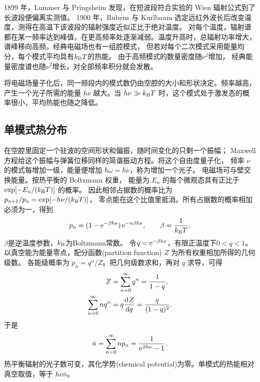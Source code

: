 1899 年，Lummer 与 Pringsheim 发现，在短波段符合实验的 Wien 辐射公式到了长波段便偏离实测值。
1900 年，Rubens 与 Kurlbaum 选定远红外波长后改变温度，测得在高温下该波段的辐射强度近似正比于绝对温度\cite{history}。
对每个温度，辐射谱都在某一频率达到峰值，在更高频率处逐渐减弱。温度升高时，总辐射功率增大，谱峰移向高频。经典电磁场也有一组腔模式，
但若对每个二次模式采用能量均分，每个模式平均具有$k_{\mathrm{B}} T$的热能。
由于高频模式的数量密度随$\nu^2$增加，
经典能量密度谱也随$\nu^2$增长，对全部频率积分就会发散。

将电磁场量子化后，同一频段内的模式数仍由空腔的大小和形状决定。频率越高，产生一个光子所需的能量 $h\nu$ 越大。当 $h\nu \gg k_{\mathrm{B}} T$ 时，这个模式处于激发态的概率很小，平均热能也随之降低。

\subsection{单模式热分布}
\label{ss:thermal-occupation}

在空腔里固定一个驻波的空间形状和偏振，随时间变化的只剩一个振幅；
Maxwell 方程给这个振幅与弹簧位移同样的简谐振动方程。将这个自由度量子化，
频率 $\nu$ 的模式每增加一级，能量便增加 $\hbar\omega = h\nu$，称为增加一个光子。
电磁场可与壁交换能量。按热平衡的 Boltzmann 权重，
能量为 $E_n$ 的每个微观态具有正比于 $\exp[-E_n/(k_{\mathrm{B}} T)]$ 的概率。
因此相邻占据数的概率比为 $p_{n+1}/p_n = \exp[-h\nu/(k_{\mathrm{B}} T)]$，
零点能在这个比值里抵消。所有占据数的概率相加必须为一，得到
\begin{equation}
    p_n = (1 - \mathop{}\!\mathrm{e}^{-\beta h\nu})\mathop{}\!\mathrm{e}^{-n\beta h\nu},\qquad\beta = \frac1{k_{\mathrm{B}} T}.
\end{equation}
$\beta$是逆温度参数，$k_{\mathrm{B}}$为Boltzmann常数。
令$q = \mathop{}\!\mathrm{e}^{-\beta h\nu}$，有限正温度下$0 < q < 1$。
以真空能为能量零点，配分函数(partition function) $Z$ 为所有权重相加所得的几何级数。
各能级概率为 $p_n = q^n/Z$。把几何级数求和，再对 $q$ 求导，可得
\begin{subequations}
    \begin{align}
        Z &= \sum_{n=0}^\infty q^n = \frac1{1 - q},\\
        \sum_{n=0}^\infty nq^n &= q\frac{\mathop{}\!\mathrm{d}^{}Z}{\mathrm{d}{q}^{}} = \frac{q}{(1 - q)^2}.
    \end{align}
\end{subequations}
于是
\begin{equation}
    \bar n = \sum_{n=0}^\infty np_n = \frac1{\mathop{}\!\mathrm{e}^{\beta h\nu} - 1}.
\end{equation}
热平衡辐射的光子数可变，其化学势(chemical potential)为零。单模式的热能相对真空取值，等于 $h\nu\bar n$。

